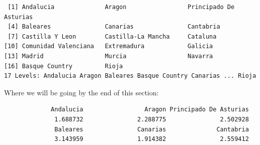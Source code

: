 \documentclass[
  letterpaper,
  DIV=11,
  numbers=noendperiod]{scrreprt}
\newenvironment{Shaded}{\begin{snugshade}}{\end{snugshade}}
\newcommand{\CommentTok}[1]{\textcolor[rgb]{0.37,0.37,0.37}{#1}}
\newcommand{\ConstantTok}[1]{\textcolor[rgb]{0.56,0.35,0.01}{#1}}
\newcommand{\ControlFlowTok}[1]{\textcolor[rgb]{0.00,0.23,0.31}{#1}}
\newcommand{\DecValTok}[1]{\textcolor[rgb]{0.68,0.00,0.00}{#1}}
\newcommand{\FunctionTok}[1]{\textcolor[rgb]{0.28,0.35,0.67}{#1}}
\newcommand{\NormalTok}[1]{\textcolor[rgb]{0.00,0.23,0.31}{#1}}
\newcommand{\OtherTok}[1]{\textcolor[rgb]{0.00,0.23,0.31}{#1}}
\newcommand{\SpecialCharTok}[1]{\textcolor[rgb]{0.37,0.37,0.37}{#1}}
\begin{document}
\begin{verbatim}
 [1] Andalucia              Aragon                 Principado De Asturias
 [4] Baleares               Canarias               Cantabria             
 [7] Castilla Y Leon        Castilla-La Mancha     Cataluna              
[10] Comunidad Valenciana   Extremadura            Galicia               
[13] Madrid                 Murcia                 Navarra               
[16] Basque Country         Rioja                 
17 Levels: Andalucia Aragon Baleares Basque Country Canarias ... Rioja
\end{verbatim}

Where we will be going by the end of this section:

\begin{Shaded}
\end{Shaded}

\begin{verbatim}
             Andalucia                 Aragon Principado De Asturias 
              1.688732               2.288775               2.502928 
              Baleares               Canarias              Cantabria 
              3.143959               1.914382               2.559412 
\end{verbatim}
\end{document}
